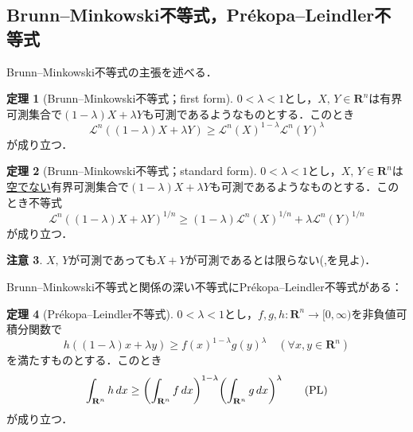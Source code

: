 \documentclass[a4j]{ltjsarticle}
\newcommand{\Rset}{\mathbf{R}}
\newcommand{\Lm}{\mathcal{L}}
\newcommand{\1}{\bm{1}}
\numberwithin{equation}{section}
\theoremstyle{definition}
\newtheorem{thm}{定理}[section]
\newtheorem{rmk}[thm]{注意}
\begin{document}
\subsection{Brunn--Minkowski不等式，Pr\'ekopa--Leindler不等式}
Brunn--Minkowski不等式の主張を述べる．
\begin{thm}[Brunn--Minkowski不等式；first form]\label{thm:bm1}
    $0<\lambda<1$とし，$X,\,Y\in \Rset^n$は有界可測集合で$(1-\lambda)X+\lambda Y$も可測であるようなものとする．このとき
    \begin{equation}
        \Lm^n((1-\lambda)X+\lambda Y)\geq \Lm^n(X)^{1-\lambda}\Lm^n(Y)^{\lambda}\label{eq:bm1}\tag{BM1}
    \end{equation}
    が成り立つ．
\end{thm}
\begin{thm}[Brunn--Minkowski不等式；standard form]\label{thm:bm2}
    $0<\lambda<1$とし，$X,\,Y\in \Rset^n$は\underline{空でない}有界可測集合で$(1-\lambda)X+\lambda Y$も可測であるようなものとする．このとき不等式
    \begin{equation}
        \Lm^n((1-\lambda)X+\lambda Y)^{1/n}\geq (1-\lambda)\Lm^n(X)^{1/n}+\lambda \Lm^n(Y)^{1/n}\label{eq:bm2}\tag{BM2}
    \end{equation}
    が成り立つ．
\end{thm}
\begin{rmk}
    $X,\,Y$が可測であっても$X+Y$が可測であるとは限らない(\cite{S},\cite{ES}を見よ)．
\end{rmk}
Brunn--Minkowski不等式と関係の深い不等式にPr\'ekopa--Leindler不等式がある：
\begin{thm}[Pr\'ekopa--Leindler不等式]\label{thm:pl}
    $0<\lambda<1$とし，$f,g,h\colon \Rset^n\to[0,\infty)$を非負値可積分関数で
    \begin{equation}
        h((1-\lambda)x+\lambda y)\geq f(x)^{1-\lambda}g(y)^{\lambda}\quad (\forall x,y\in \Rset^n)
    \end{equation}
    を満たすものとする．このとき
    \begin{equation}
        \int_{\Rset^n}h\,dx\geq \qty(\int_{\Rset^n}f\,dx)^{1-\lambda}\qty(\int_{\Rset^n}g\,dx)^{\lambda}\label{eq:pl}\tag{PL}
    \end{equation}
    が成り立つ．
\end{thm}
\end{document}
